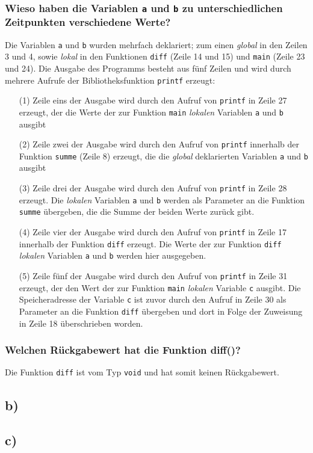 \documentclass[11pt, a4paper]{scrartcl}
\begin{document}
\subsubsection*{Wieso haben die Variablen \texttt{a} und \texttt{b} zu unterschiedlichen Zeitpunkten verschiedene Werte?}
Die Variablen \texttt{a} und \texttt{b} wurden mehrfach deklariert; zum einen \textit{global} in den Zeilen 3 und 4, sowie \textit{lokal} in den Funktionen \texttt{diff} (Zeile 14 und 15) und \texttt{main} (Zeile 23 und 24). Die Ausgabe des Programms besteht aus fünf Zeilen und wird durch mehrere Aufrufe der Bibliotheksfunktion \texttt{printf} erzeugt:
\begin{enumerate}
\item[(1)] Zeile eins der Ausgabe wird durch den Aufruf von \texttt{printf} in Zeile 27 erzeugt, der die Werte der zur Funktion \texttt{main} \textit{lokalen} Variablen \texttt{a} und \texttt{b} ausgibt
\item[(2)] Zeile zwei der Ausgabe wird durch den Aufruf von \texttt{printf} innerhalb der Funktion \texttt{summe} (Zeile 8) erzeugt, die die \textit{global} deklarierten Variablen \texttt{a} und \texttt{b} ausgibt 
\item[(3)] Zeile drei der Ausgabe wird durch den Aufruf von \texttt{printf} in Zeile 28 erzeugt. Die \textit{lokalen} Variablen \texttt{a} und \texttt{b} werden als Parameter an die Funktion \texttt{summe} übergeben, die die Summe der beiden Werte zurück gibt.
\item[(4)] Zeile vier der Ausgabe wird durch den Aufruf von \texttt{printf} in Zeile 17 innerhalb der Funktion \texttt{diff} erzeugt. Die Werte der zur Funktion \texttt{diff} \textit{lokalen} Variablen \texttt{a} und \texttt{b} werden hier ausgegeben. 
\item[(5)] Zeile fünf der Ausgabe wird durch den Aufruf von \texttt{printf} in Zeile 31 erzeugt, der den Wert der zur Funktion \texttt{main} \textit{lokalen} Variable \texttt{c} ausgibt. Die Speicheradresse der Variable \texttt{c} ist zuvor durch den Aufruf in Zeile 30 als Parameter an die Funktion \texttt{diff} übergeben und dort in Folge der Zuweisung in Zeile 18 überschrieben worden. 
\end{enumerate} 
\subsubsection*{Welchen Rückgabewert hat die Funktion diff()?}
Die Funktion \texttt{diff} ist vom Typ \texttt{void} und hat somit keinen Rückgabewert.
\newpage
\subsection*{b)}

\newpage
\subsection*{c)} 

\newpage
%
%
\end{document}
